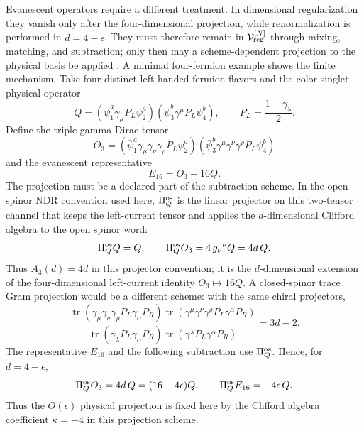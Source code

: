 Evanescent operators require a different treatment.  In dimensional
regularization they vanish only after the four-dimensional projection, while
renormalization is performed in \(d=4-\epsilon\).  They must therefore remain
in \(\mathcal V_{\rm reg}^{[N]}\) through mixing, matching, and subtraction;
only then may a scheme-dependent projection to the physical basis be applied
\cite{HerrlichNierste1995Evanescent,FuentesMartinEtAl2023EvanescentMatching}.
A minimal four-fermion example shows the finite mechanism.  Take four distinct
left-handed fermion flavors and the color-singlet physical operator
\[
  Q
  =
  (\bar\psi_1^a\gamma_\mu P_L\psi_2^a)
  (\bar\psi_3^b\gamma^\mu P_L\psi_4^b),
  \qquad
  P_L=\frac{1-\gamma_5}{2}.
\]
Define the triple-gamma Dirac tensor
\[
  O_3
  =
  (\bar\psi_1^a\gamma_\mu\gamma_\nu\gamma_\rho P_L\psi_2^a)
  (\bar\psi_3^b\gamma^\mu\gamma^\nu\gamma^\rho P_L\psi_4^b)
\]
and the evanescent representative
\[
  E_{16}=O_3-16Q .
\]
The projection must be a declared part of the subtraction scheme.  In the
open-spinor NDR convention used here, \(\Pi_Q^{\rm os}\) is the linear
projector on this two-tensor channel that keeps the left-current tensor and
applies the \(d\)-dimensional Clifford algebra to the open spinor word:
\[
  \Pi_Q^{\rm os}Q=Q,
  \qquad
  \Pi_Q^{\rm os}O_3
  =
  4\,g_\nu{}^\nu Q
  =
  4d\,Q .
\]
Thus \(A_3(d)=4d\) in this projector convention; it is the
\(d\)-dimensional extension of the four-dimensional left-current identity
\(O_3\mapsto16Q\).  A closed-spinor trace Gram projection would be a different
scheme: with the same chiral projectors,
\[
  \frac{
    \operatorname{tr}(\gamma_\mu\gamma_\nu\gamma_\rho P_L\gamma_\alpha P_R)
    \operatorname{tr}(\gamma^\mu\gamma^\nu\gamma^\rho P_L\gamma^\alpha P_R)
  }{
    \operatorname{tr}(\gamma_\lambda P_L\gamma_\alpha P_R)
    \operatorname{tr}(\gamma^\lambda P_L\gamma^\alpha P_R)
  }
  =
  3d-2 .
\]
The representative \(E_{16}\) and the following subtraction use
\(\Pi_Q^{\rm os}\).  Hence, for \(d=4-\epsilon\),
\begin{equation}
  \Pi_Q^{\rm os} O_3 = 4d\,Q=(16-4\epsilon)Q,
  \qquad
  \Pi_Q^{\rm os} E_{16}=-4\epsilon\,Q .
  \label{eq:eft-evanescent-triple-gamma-projection}
\end{equation}
Thus the \(O(\epsilon)\) physical projection is fixed here by the Clifford
algebra coefficient \(\kappa=-4\) in this projection scheme.

